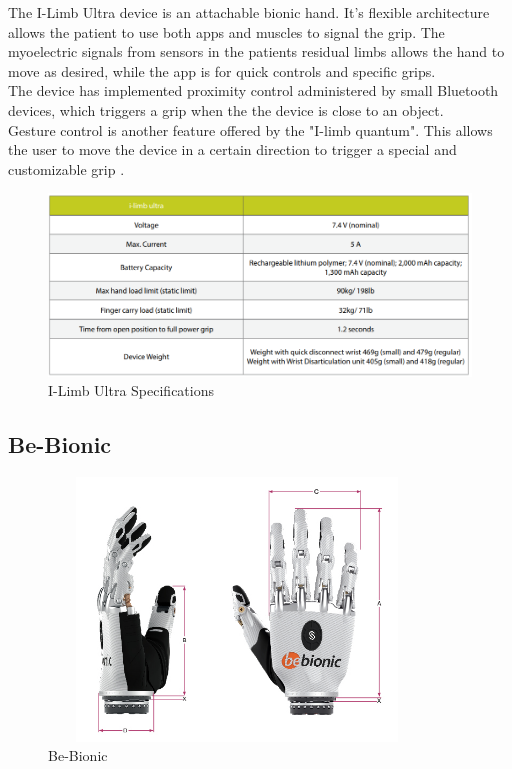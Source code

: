 The I-Limb Ultra device is an attachable bionic hand. It's flexible architecture allows the patient to use both apps and muscles to signal the grip. The myoelectric signals from sensors in the patients residual limbs allows the hand to move as desired, while the app is for quick controls and specific grips.\\
The device has implemented proximity control administered by small Bluetooth devices, which triggers a grip when the the device is close to an object.\\
Gesture control is another feature offered by the "I-limb quantum". This allows the user to move the device in a certain direction to trigger a special and customizable grip \cite{I-limbUltra}.

\begin{figure}[H]
    \centering
    \includegraphics[width=15cm]{Sections/Contextual_Analysis/ProsthesesPics/specs.png}
    \caption{I-Limb Ultra Specifications\cite{I-limbUltra}}
    \label{fig:Ilimb-UltraSpecs}
\end{figure}
\clearpage

\subsection{Be-Bionic}

\begin{figure}[H]
    \centering
    \includegraphics[width=10cm,height=7cm]{Sections/Contextual_Analysis/ProsthesesPics/Be-bionic.jpg}
    \caption{Be-Bionic \cite{Be-bionic}}
    \label{fig:Be-Bionic}
\end{figure}

